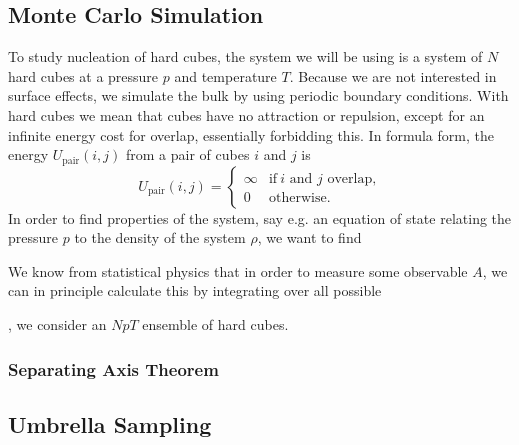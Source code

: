 \documentclass[thesis]{subfiles}
\begin{document}
\subsection{Monte Carlo Simulation}

To study nucleation of hard cubes, the system we will be using is a system of $N$ hard cubes at a pressure $p$ and temperature $T$. Because we are not interested in surface effects, we simulate the bulk by using periodic boundary conditions. With hard cubes we mean that cubes have no attraction or repulsion, except for an infinite energy cost for overlap, essentially forbidding this. In formula form, the energy $U_{\textrm{pair}}(i,j)$ from a pair of cubes $i$ and $j$ is
\begin{equation}
	U_{\textrm{pair}}(i,j) = 
	\begin{cases}
		\infty & \text{if}\ i \text{ and } j \text{ overlap,}\\
		0 & \text{otherwise.}
	\end{cases}
\end{equation}
In order to find properties of the system, say e.g. an equation of state relating the pressure $p$ to the density of the system $\rho$, we want to find

We know from statistical physics that in order to measure some observable $A$, we can in principle calculate this by integrating over all possible 

, we consider an $NpT$ ensemble of hard cubes.  


\subsubsection{Separating Axis Theorem}



\subsection{Umbrella Sampling}
\end{document}
